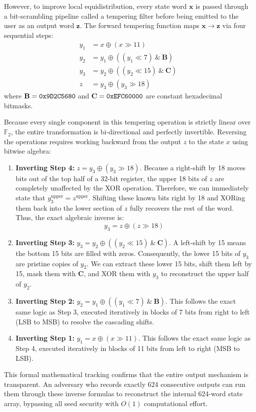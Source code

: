 \documentclass[twocolumn,10pt]{article}
\begin{document}
However, to improve local equidistribution, every state word $\mathbf{x}$ is passed through a bit-scrambling pipeline called a tempering filter before being emitted to the user as an output word $\mathbf{z}$. The forward tempering function maps $\mathbf{x} \to \mathbf{z}$ via four sequential steps:
\begin{align}
y_1 &= x \oplus (x \gg 11) \label{eq:temp1} \\
y_2 &= y_1 \oplus ((y_1 \ll 7) \ \& \ \mathbf{B}) \label{eq:temp2} \\
y_3 &= y_2 \oplus ((y_2 \ll 15) \ \& \ \mathbf{C}) \label{eq:temp3} \\
z &= y_3 \oplus (y_3 \gg 18) \label{eq:temp4}
\end{align}
where $\mathbf{B} = \text{\texttt{0x9D2C5680}}$ and $\mathbf{C} = \text{\texttt{0xEFC60000}}$ are constant hexadecimal bitmasks.

Because every single component in this tempering operation is strictly linear over $\mathbb{F}_2$, the entire transformation is bi-directional and perfectly invertible. Reversing the operations requires working backward from the output $z$ to the state $x$ using bitwise algebra:
\begin{enumerate}
\item \textbf{Inverting Step 4:} $z = y_3 \oplus (y_3 \gg 18)$. Because a right-shift by 18 moves bits out of the top half of a 32-bit register, the upper 18 bits of $z$ are completely unaffected by the XOR operation. Therefore, we can immediately state that $y_3^{\text{upper}} = z^{\text{upper}}$. Shifting these known bits right by 18 and XORing them back into the lower section of $z$ fully recovers the rest of the word. Thus, the exact algebraic inverse is:
\begin{equation}
y_3 = z \oplus (z \gg 18)
\end{equation}
\item \textbf{Inverting Step 3:} $y_3 = y_2 \oplus ((y_2 \ll 15) \ \& \ \mathbf{C})$. A left-shift by 15 means the bottom 15 bits are filled with zeros. Consequently, the lower 15 bits of $y_3$ are pristine copies of $y_2$. We can extract these lower 15 bits, shift them left by 15, mask them with $\mathbf{C}$, and XOR them with $y_3$ to reconstruct the upper half of $y_2$. 
\item \textbf{Inverting Step 2:} $y_2 = y_1 \oplus ((y_1 \ll 7) \ \& \ \mathbf{B})$. This follows the exact same logic as Step 3, executed iteratively in blocks of 7 bits from right to left (LSB to MSB) to resolve the cascading shifts.
\item \textbf{Inverting Step 1:} $y_1 = x \oplus (x \gg 11)$. This follows the exact same logic as Step 4, executed iteratively in blocks of 11 bits from left to right (MSB to LSB).
\end{enumerate}
This formal mathematical tracking confirms that the entire output mechanism is transparent. An adversary who records exactly 624 consecutive outputs can run them through these inverse formulas to reconstruct the internal 624-word state array, bypassing all seed security with $O(1)$ computational effort.
\end{document}
